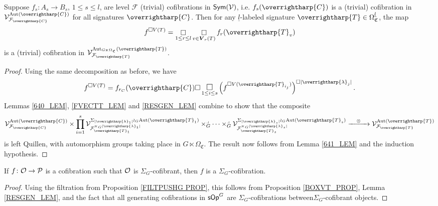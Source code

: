 \documentclass[a4paper,10pt
,draft
]{article}%
\renewcommand{\F}{\mathcal F}
\renewcommand{\1}{\eta}%
\newcommand{\vect}[1]{\text{\overrightharp{\ensuremath{#1}}}}
\begin{document}
\begin{proposition}
      \label{BOXVT_PROP}
      Suppose $f_s: A_s \to B_s$, $1 \leq s \leq l$, are level $\F$ (trivial) cofibrations in $\mathsf{Sym}(\mathcal V)$, i.e. $f_s(\vect C)$ is a (trivial) cofibration in $\V^{\Aut(\vect C)}_{\F_{\vect C}}$ for all signatures $\vect C$.
      Then for any $\underline{l}$-labeled signature $\vect T \in \Omega^{\underline{l}}_{\mathfrak C}$, the map
      \[
            f^{\square V(T)} = \mathop{\square}\limits_{1 \leq r \leq l} \mathop{\square}\limits_{v \in \boldsymbol{V}_r(T)} f_r(\vect T_v)
      \]
      is a (trivial) cofibration in $\V^{\Aut_{G \ltimes \Omega_{\mathfrak C}}(\vect T)}_{\F_{\vect T}}$.
\end{proposition}
\begin{proof}
      Using the same decomposition as before, we have
      \[
            f^{\square V(T)} = f_{r_C}(\vect C) \square \mathop{\mathlarger{\square}}\limits_{1 \leq i \leq s}\left(f^{\square V(\vect T_{i_j})}\right)^{\square |\vect \lambda_j|}.
      \]
      Lemmas \ref{640_LEM}, \ref{FVECTT_LEM} and \ref{RESGEN_LEM} combine to show that the composite
      \[
            \V^{\Aut(\vect C)}_{\F_{\vect C}} \times
            \prod_{i=1}^s
            \V^{\Sigma_{|\vect \lambda_1|} \wr_G \Aut(\vect T_1)}_{\F_{\vect T_1}^{\ltimes_G |\vect \lambda_1|}}
            \times_G^\lrcorner
            \dots
            \times_G^\lrcorner
            \V^{\Sigma_{|\vect \lambda_s|} \wr_G \Aut(\vect T_s)}_{\F_{\vect T_s}^{\ltimes_G |\vect \lambda_s|}}
            \xrightarrow{\quad \otimes \quad}
            \V^{\Aut(\vect T)}_{\F_{\vect T}}
      \]
      is left Quillen,
      with automorphism groups taking place in $G \ltimes \Omega_{\mathfrak C}$. 
      The result now follows from Lemma \ref{641_LEM} and the induction hypothesis.
\end{proof}


\begin{corollary}
      \label{SIGMAG_COF_COR}
      If $f \colon \mathcal{O} \to \mathcal{P}$ is a cofibration such that $\mathcal{O}$ is $\Sigma_G$-cofibrant, then $f$ is a $\Sigma_G$-cofibration.
\end{corollary}
\begin{proof}
      Using the filtration from Proposition \ref{FILTPUSHG PROP},
      this follows from Proposition \ref{BOXVT_PROP}, Lemma \ref{RESGEN_LEM}, and the fact that all generating cofibrations in $\mathsf{sOp}^G$ are $\Sigma_G$-cofibrations between$ \Sigma_G$-cofibrant objects.
\end{proof}
\end{document}

